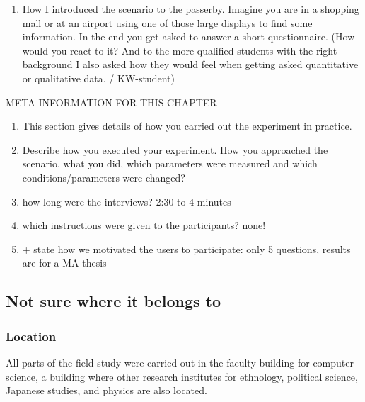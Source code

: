 

		\begin{enumerate}
		\item How I introduced the scenario to the passerby. Imagine you are in a shopping mall or at an airport using one of those large displays to find some information. In the end you get asked to answer a short questionnaire. (How would you react to it? And to the more qualified students with the right background I also asked how they would feel when getting asked quantitative or qualitative data. / KW-student) 
		\end{enumerate}

		META-INFORMATION FOR THIS CHAPTER
		\begin{enumerate}
		\item This section gives details of how you carried out the experiment in practice.
		\item Describe how you executed your experiment. How you approached the scenario, what you did, which parameters were measured and which conditions/parameters were changed? 
		\item how long were the interviews? 2:30 to 4 minutes
		\item which instructions were given to the participants? none! 
		\item + state how we motivated the users to participate: only 5 questions, results are for a MA thesis

		\end{enumerate}








\subsection{Not sure where it belongs to}

	\subsubsection{Location}

	All parts of the field study were carried out in the faculty building for computer science, a building where other research institutes for ethnology, political science, Japanese studies, and physics are also located.

